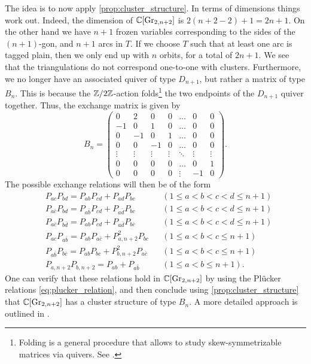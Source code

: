 The idea is to now apply \cref{prop:cluster_structure}. In terms of dimensions things
work out. Indeed, the dimension of $\mathbb{C}[\operatorname{Gr}_{2,n+2}]$ is $2(n+2-2) + 1 = 2n + 1$. On
the other hand we have $n+1$ frozen variables corresponding to the sides of the
$(n+1)$-gon, and $n+1$ arcs in $T$. If we choose $T$ such that at least one arc is
tagged plain, then we only end up with $n$ orbits, for a total of $2n + 1$. We see that
the triangulations do not correspond one-to-one with clusters. Furthermore, we no
longer have an associated quiver of type $D_{n+1}$, but rather a matrix of type $B_n$.
This is because the $\mathbb{Z}/2\mathbb{Z}$-action folds\footnote{Folding is a general procedure
	that allows to study skew-symmetrizable matrices via quivers. See \cite[Chapter
		4]{FominWilliams2021IntroductionCA_4-5}.} the two endpoints of the $D_{n+1}$ quiver
together. Thus, the exchange matrix is given by
\begin{equation*}
	B_n = \begin{pmatrix}
		0      & 2      & 0      & 0      & \dots  & 0      & 0      \\
		-1     & 0      & 1      & 0      & \dots  & 0      & 0      \\
		0      & -1     & 0      & 1      & \dots  & 0      & 0      \\
		0      & 0      & -1     & 0      & \dots  & 0      & 0      \\
		\vdots & \vdots & \vdots & \vdots & \ddots & \vdots & \vdots \\
		0      & 0      & 0      & 0      & \dots  & 0      & 1      \\
		0      & 0      & 0      & 0      & \vdots & -1     & 0
	\end{pmatrix}.
\end{equation*}
%
The possible exchange relations will then be of the form
\begin{align*}
	 & P_{ac} P_{bd} = P_{ab}P_{cd} + P_{ad}P_{bc}                        &  & (1\leq a < b < c < d \leq n+1)  \\
	 & P_{a \bar{c}}P_{bd} = P_{a\bar{b}}P_{cd} + P_{a\bar{d}}P_{bc}      &  & (1 \leq a < b < c < d \leq n+1) \\
	 & P_{a\bar{c}}P_{b\bar{d}} = P_{ab}P_{cd} + P_{a\bar{d}}P_{b\bar{c}} &  & (1\leq a < b < c < d \leq n+1)  \\
	 & P_{ac}P_{a\bar{b}} = P_{ab}P_{a\bar{c}} + P^2_{a,n+2}P_{bc}        &  & (1 \leq a < b < c \leq n+1)     \\
	 & P_{a\bar{b}}P_{b\bar{c}} = P_{ab}P_{bc} + P_{b,n+2}^2 P_{a\bar{c}} &  & (1 \leq a < b < c \leq n+1)     \\
	 & P_{a,n+2}P_{b,n+2} = P_{ab} + P_{a\bar{b}}                         &  & (1 \leq a < b \leq n+1).
\end{align*}
%
One can verify that these relations hold in $\mathbb{C}[\operatorname{Gr}_{2, n+2}]$ by using the Plücker
relations \cref{eq:plucker_relation}, and then conclude using
\cref{prop:cluster_structure} that $\mathbb{C}[\operatorname{Gr}_{2, n+2}]$ has a cluster structure of type
$B_n$. A more detailed approach is outlined in \cite[Example
	6.3.2]{FominWilliams2021IntroductionCA_6}.

